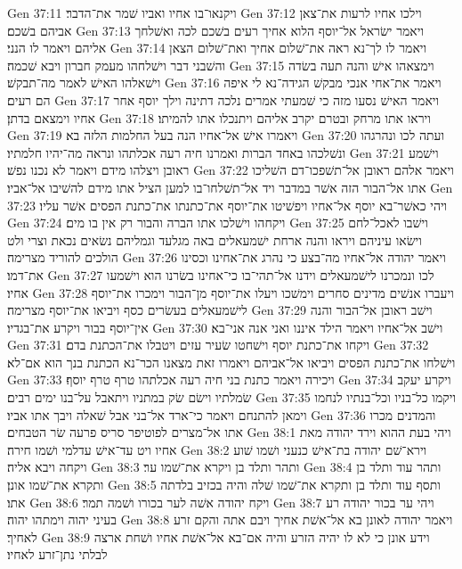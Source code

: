 Gen 37:11  ויקנאו־בו אחיו ואביו שׁמר את־הדבר׃
Gen 37:12  וילכו אחיו לרעות את־צאן אביהם בשׁכם׃
Gen 37:13  ויאמר ישׂראל אל־יוסף הלוא אחיך רעים בשׁכם לכה ואשׁלחך אליהם ויאמר לו הנני׃
Gen 37:14  ויאמר לו לך־נא ראה את־שׁלום אחיך ואת־שׁלום הצאן והשׁבני דבר וישׁלחהו מעמק חברון ויבא שׁכמה׃
Gen 37:15  וימצאהו אישׁ והנה תעה בשׂדה וישׁאלהו האישׁ לאמר מה־תבקשׁ׃
Gen 37:16  ויאמר את־אחי אנכי מבקשׁ הגידה־נא לי איפה הם רעים׃
Gen 37:17  ויאמר האישׁ נסעו מזה כי שׁמעתי אמרים נלכה דתינה וילך יוסף אחר אחיו וימצאם בדתן׃
Gen 37:18  ויראו אתו מרחק ובטרם יקרב אליהם ויתנכלו אתו להמיתו׃
Gen 37:19  ויאמרו אישׁ אל־אחיו הנה בעל החלמות הלזה בא׃
Gen 37:20  ועתה לכו ונהרגהו ונשׁלכהו באחד הברות ואמרנו חיה רעה אכלתהו ונראה מה־יהיו חלמתיו׃
Gen 37:21  וישׁמע ראובן ויצלהו מידם ויאמר לא נכנו נפשׁ׃
Gen 37:22  ויאמר אלהם ראובן אל־תשׁפכו־דם השׁליכו אתו אל־הבור הזה אשׁר במדבר ויד אל־תשׁלחו־בו למען הציל אתו מידם להשׁיבו אל־אביו׃
Gen 37:23  ויהי כאשׁר־בא יוסף אל־אחיו ויפשׁיטו את־יוסף את־כתנתו את־כתנת הפסים אשׁר עליו׃
Gen 37:24  ויקחהו וישׁלכו אתו הברה והבור רק אין בו מים׃
Gen 37:25  וישׁבו לאכל־לחם וישׂאו עיניהם ויראו והנה ארחת ישׁמעאלים באה מגלעד וגמליהם נשׂאים נכאת וצרי ולט הולכים להוריד מצרימה׃
Gen 37:26  ויאמר יהודה אל־אחיו מה־בצע כי נהרג את־אחינו וכסינו את־דמו׃
Gen 37:27  לכו ונמכרנו לישׁמעאלים וידנו אל־תהי־בו כי־אחינו בשׂרנו הוא וישׁמעו אחיו׃
Gen 37:28  ויעברו אנשׁים מדינים סחרים וימשׁכו ויעלו את־יוסף מן־הבור וימכרו את־יוסף לישׁמעאלים בעשׂרים כסף ויביאו את־יוסף מצרימה׃
Gen 37:29  וישׁב ראובן אל־הבור והנה אין־יוסף בבור ויקרע את־בגדיו׃
Gen 37:30  וישׁב אל־אחיו ויאמר הילד איננו ואני אנה אני־בא׃
Gen 37:31  ויקחו את־כתנת יוסף וישׁחטו שׂעיר עזים ויטבלו את־הכתנת בדם׃
Gen 37:32  וישׁלחו את־כתנת הפסים ויביאו אל־אביהם ויאמרו זאת מצאנו הכר־נא הכתנת בנך הוא אם־לא׃
Gen 37:33  ויכירה ויאמר כתנת בני חיה רעה אכלתהו טרף טרף יוסף׃
Gen 37:34  ויקרע יעקב שׂמלתיו וישׂם שׂק במתניו ויתאבל על־בנו ימים רבים׃
Gen 37:35  ויקמו כל־בניו וכל־בנתיו לנחמו וימאן להתנחם ויאמר כי־ארד אל־בני אבל שׁאלה ויבך אתו אביו׃
Gen 37:36  והמדנים מכרו אתו אל־מצרים לפוטיפר סריס פרעה שׂר הטבחים׃
Gen 38:1  ויהי בעת ההוא וירד יהודה מאת אחיו ויט עד־אישׁ עדלמי ושׁמו חירה׃
Gen 38:2  וירא־שׁם יהודה בת־אישׁ כנעני ושׁמו שׁוע ויקחה ויבא אליה׃
Gen 38:3  ותהר ותלד בן ויקרא את־שׁמו ער׃
Gen 38:4  ותהר עוד ותלד בן ותקרא את־שׁמו אונן׃
Gen 38:5  ותסף עוד ותלד בן ותקרא את־שׁמו שׁלה והיה בכזיב בלדתה אתו׃
Gen 38:6  ויקח יהודה אשׁה לער בכורו ושׁמה תמר׃
Gen 38:7  ויהי ער בכור יהודה רע בעיני יהוה וימתהו יהוה׃
Gen 38:8  ויאמר יהודה לאונן בא אל־אשׁת אחיך ויבם אתה והקם זרע לאחיך׃
Gen 38:9  וידע אונן כי לא לו יהיה הזרע והיה אם־בא אל־אשׁת אחיו ושׁחת ארצה לבלתי נתן־זרע לאחיו׃
